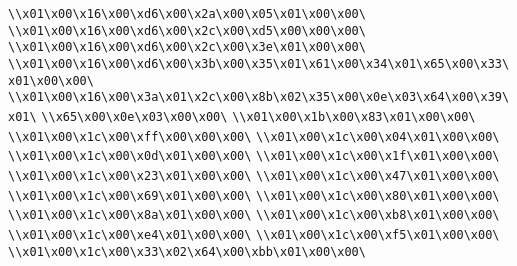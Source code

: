 \verb|\\x01\x00\x16\x00\xd6\x00\x2a\x00\x05\x01\x00\x00\|\newline
\verb|\\x01\x00\x16\x00\xd6\x00\x2c\x00\xd5\x00\x00\x00\|\newline
\verb|\\x01\x00\x16\x00\xd6\x00\x2c\x00\x3e\x01\x00\x00\|\newline
\verb|\\x01\x00\x16\x00\xd6\x00\x3b\x00\x35\x01\x61\x00\x34\x01\x65\x00\x33\x01\x00\x00\|\newline
\verb|\\x01\x00\x16\x00\x3a\x01\x2c\x00\x8b\x02\x35\x00\x0e\x03\x64\x00\x39\x01\|\newline
\verb|\\x65\x00\x0e\x03\x00\x00\|\newline
\verb|\\x01\x00\x1b\x00\x83\x01\x00\x00\|\newline
\verb|\\x01\x00\x1c\x00\xff\x00\x00\x00\|\newline
\verb|\\x01\x00\x1c\x00\x04\x01\x00\x00\|\newline
\verb|\\x01\x00\x1c\x00\x0d\x01\x00\x00\|\newline
\verb|\\x01\x00\x1c\x00\x1f\x01\x00\x00\|\newline
\verb|\\x01\x00\x1c\x00\x23\x01\x00\x00\|\newline
\verb|\\x01\x00\x1c\x00\x47\x01\x00\x00\|\newline
\verb|\\x01\x00\x1c\x00\x69\x01\x00\x00\|\newline
\verb|\\x01\x00\x1c\x00\x80\x01\x00\x00\|\newline
\verb|\\x01\x00\x1c\x00\x8a\x01\x00\x00\|\newline
\verb|\\x01\x00\x1c\x00\xb8\x01\x00\x00\|\newline
\verb|\\x01\x00\x1c\x00\xe4\x01\x00\x00\|\newline
\verb|\\x01\x00\x1c\x00\xf5\x01\x00\x00\|\newline
\verb|\\x01\x00\x1c\x00\x33\x02\x64\x00\xbb\x01\x00\x00\|\newline
